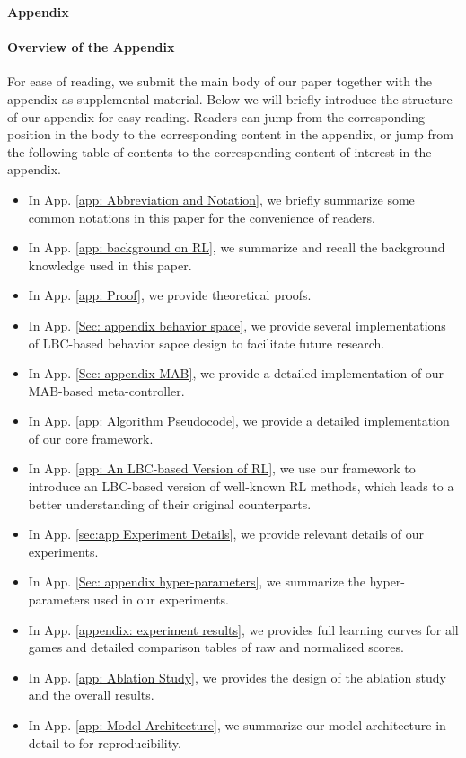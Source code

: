 \begin{center}
    \Large \textbf{Appendix}  
\end{center}
\paragraph{Overview of the Appendix} For ease of reading, we submit the main body of our paper together with the appendix as supplemental material. Below we will briefly introduce the structure of our appendix for easy reading. Readers can jump from the corresponding position in the body to the corresponding content in the appendix, or jump from the following table of contents to the corresponding content of interest in the appendix.

\begin{itemize}
    \item In App. \ref{app: Abbreviation and Notation}, we briefly summarize some common notations  in this paper for the convenience of readers.
    \item In App. \ref{app: background on RL},  we  summarize and recall the background knowledge used in this paper.
    \item In App. \ref{app: Proof},  we provide theoretical proofs.

    \item In App. \ref{Sec: appendix behavior space},  we provide several implementations of LBC-based behavior sapce design to facilitate future research.

    \item In App. \ref{Sec: appendix MAB}, we provide a detailed implementation of our MAB-based meta-controller.
    \item In App. \ref{app: Algorithm Pseudocode}, we provide a detailed implementation of our core framework.
    \item In App. \ref{app: An LBC-based Version of RL}, we use our framework to introduce an LBC-based version of well-known RL methods, which leads to a better understanding of their original counterparts. 
    \item In App. \ref{sec:app Experiment Details}, we provide relevant details of our experiments.
    \item In App. \ref{Sec: appendix hyper-parameters},  we summarize the hyper-parameters used in our experiments.
    
    \item In App. \ref{appendix: experiment results}, we provides full learning curves for all games and detailed comparison tables of raw and normalized scores.
    
    \item In App. \ref{app: Ablation Study}, we provides the design of the ablation study and the overall results.

    \item In App. \ref{app: Model Architecture}, we  summarize our  model architecture in detail to for reproducibility.

\end{itemize}

